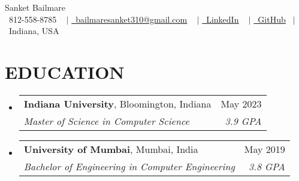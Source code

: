 \documentclass[letterpaper,11pt]{article}
\makeatletter
\newcommand{\resumeSubheading}[4]{
  \vspace{-2pt}\item
    \begin{tabular*}{1.0\textwidth}[t]{l@{\extracolsep{\fill}}r}
      {#1} & {\small #2} \\
      \textit{\small#3} & \textit{\small #4} \\
    \end{tabular*}\vspace{-7pt}
}
\newcommand{\resumeSubHeadingListStart}{\begin{itemize}[leftmargin=0.0in, label={}]}
\newcommand{\resumeSubHeadingListEnd}{\end{itemize}}
\makeatother
\begin{document}
\begin{center}
    {\huge  Sanket Bailmare} \\ \vspace{5pt}
    \small \raisebox{-0.1\height}\ 812-558-8785 ~ $|$ \href{mailto:bailmaresanket310@gmail.com}{\raisebox{-0.2\height}\  \underline{bailmaresanket310@gmail.com}} ~ $|$
    \href{https://www.linkedin.com/in/sanket-bailmare/}{\raisebox{-0.2\height}\ \underline{LinkedIn}}  ~ $|$
    \href{https://github.com/SansBailmare}{\raisebox{-0.2\height}\ \underline{GitHub}}~ $|$
    \small \raisebox{-0.1\height}\ Indiana, USA 
    \vspace{-8pt}
\end{center}


\section{EDUCATION}
  \resumeSubHeadingListStart
    \resumeSubheading
      {\textbf{Indiana University}, Bloomington, Indiana}{May 2023}
      {Master of Science in Computer Science}{3.9 GPA}
    \resumeSubheading
      {\textbf{University of Mumbai}, Mumbai, India}{May 2019}
      {Bachelor of Engineering in Computer Engineering}{3.8 GPA}
  \resumeSubHeadingListEnd
  



%
\end{document}
